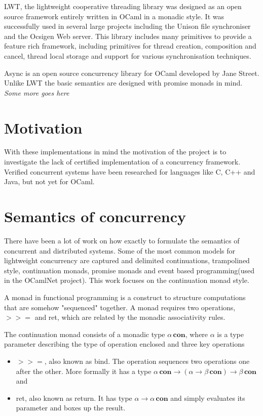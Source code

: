 \documentclass[12pt,twoside,notitlepage]{report}
\begin{document}
LWT, the lightweight cooperative threading library\cite{vouillon2008lwt} was designed as an open source framework entirely written in OCaml in a monadic style. It was successfully used in several large projects including the Unison file synchroniser and the Ocsigen Web server. This library includes many primitives to provide a feature rich framework, including primitives for thread creation, composition and cancel, thread local storage and support for various synchronisation techniques. 

Async is an open source concurrency library for OCaml developed by Jane Street. Unlike LWT the basic semantics are designed with promise monads in mind. 
\textit{Some more goes here}

\section{Motivation}
With these implementations in mind the motivation of the project is to investigate the lack of certified implementation of a concurrency framework. Verified concurrent systems have been researched for languages like C\cite{sevvcik2011relaxed}, C++ and Java\cite{lochbihler2012machine}, but not yet for OCaml.

\section{Semantics of concurrency}

There have been a lot of work on how exactly to formulate the semantics of concurrent and distributed systems. Some of the most common models for lightweight concurrency\cite{deleuzelight} are captured\cite{friedman1988applications} and delimited\cite{kiselyov2010delimited} continuations\cite{shan2004shift}, trampolined style\cite{ganz1999trampolined}, continuation monads\cite{Claessen99functionalpearls}, promise monads\cite{liskov1988promises} and event based programming(used in the OCamlNet\cite{Ocamlnet} project). This work focuses on the continuation monad style.

A monad\cite{hoareetal2001tackling} in functional programming is a construct to structure computations that are somehow "sequenced" together. A monad requires two operations, $ >>= $ and ret, which are related by the monadic associativity rules.


The continuation monad consists of a monadic type $ \alpha \, \textbf{con} $, where $ \alpha $ is a type parameter describing the type of operation enclosed and three key operations 
\begin{itemize}
\item{$>>=$, also known as bind. The operation sequences two operations one after the other. More formally it has a type $ \alpha \, \textbf{con} \rightarrow ( \alpha \rightarrow \beta \, \textbf{con}) \rightarrow \beta \, \textbf{con}  $ and }
\item{ret, also known as return. It has type $ \alpha \rightarrow \alpha \, \textbf{con} $ and simply evaluates its parameter and boxes up the result.}
\end{itemize}
\end{document}
